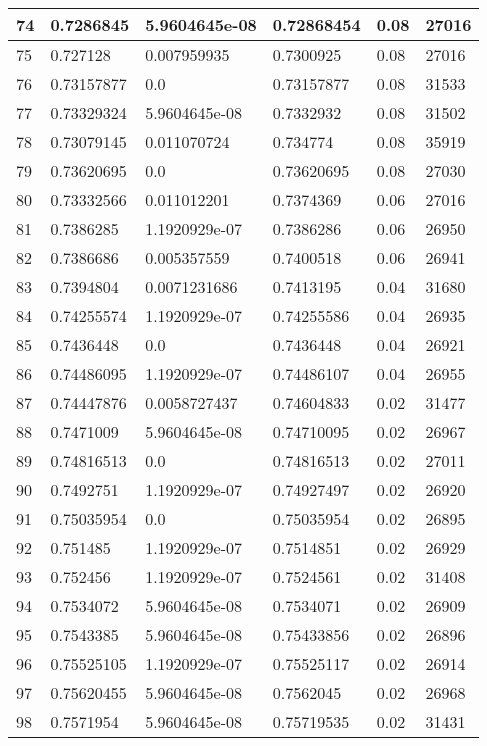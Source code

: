 \begin{longtable}{|l|l|l|l|l|l|}
74 & 0.7286845 & 5.9604645e-08 & 0.72868454 & 0.08 & 27016 \\ \hline 
75 & 0.727128 & 0.007959935 & 0.7300925 & 0.08 & 27016 \\ \hline 
76 & 0.73157877 & 0.0 & 0.73157877 & 0.08 & 31533 \\ \hline 
77 & 0.73329324 & 5.9604645e-08 & 0.7332932 & 0.08 & 31502 \\ \hline 
78 & 0.73079145 & 0.011070724 & 0.734774 & 0.08 & 35919 \\ \hline 
79 & 0.73620695 & 0.0 & 0.73620695 & 0.08 & 27030 \\ \hline 
80 & 0.73332566 & 0.011012201 & 0.7374369 & 0.06 & 27016 \\ \hline 
81 & 0.7386285 & 1.1920929e-07 & 0.7386286 & 0.06 & 26950 \\ \hline 
82 & 0.7386686 & 0.005357559 & 0.7400518 & 0.06 & 26941 \\ \hline 
83 & 0.7394804 & 0.0071231686 & 0.7413195 & 0.04 & 31680 \\ \hline 
84 & 0.74255574 & 1.1920929e-07 & 0.74255586 & 0.04 & 26935 \\ \hline 
85 & 0.7436448 & 0.0 & 0.7436448 & 0.04 & 26921 \\ \hline 
86 & 0.74486095 & 1.1920929e-07 & 0.74486107 & 0.04 & 26955 \\ \hline 
87 & 0.74447876 & 0.0058727437 & 0.74604833 & 0.02 & 31477 \\ \hline 
88 & 0.7471009 & 5.9604645e-08 & 0.74710095 & 0.02 & 26967 \\ \hline 
89 & 0.74816513 & 0.0 & 0.74816513 & 0.02 & 27011 \\ \hline 
90 & 0.7492751 & 1.1920929e-07 & 0.74927497 & 0.02 & 26920 \\ \hline 
91 & 0.75035954 & 0.0 & 0.75035954 & 0.02 & 26895 \\ \hline 
92 & 0.751485 & 1.1920929e-07 & 0.7514851 & 0.02 & 26929 \\ \hline 
93 & 0.752456 & 1.1920929e-07 & 0.7524561 & 0.02 & 31408 \\ \hline 
94 & 0.7534072 & 5.9604645e-08 & 0.7534071 & 0.02 & 26909 \\ \hline 
95 & 0.7543385 & 5.9604645e-08 & 0.75433856 & 0.02 & 26896 \\ \hline 
96 & 0.75525105 & 1.1920929e-07 & 0.75525117 & 0.02 & 26914 \\ \hline 
97 & 0.75620455 & 5.9604645e-08 & 0.7562045 & 0.02 & 26968 \\ \hline 
98 & 0.7571954 & 5.9604645e-08 & 0.75719535 & 0.02 & 31431 \\ \hline 

\end{longtable}

